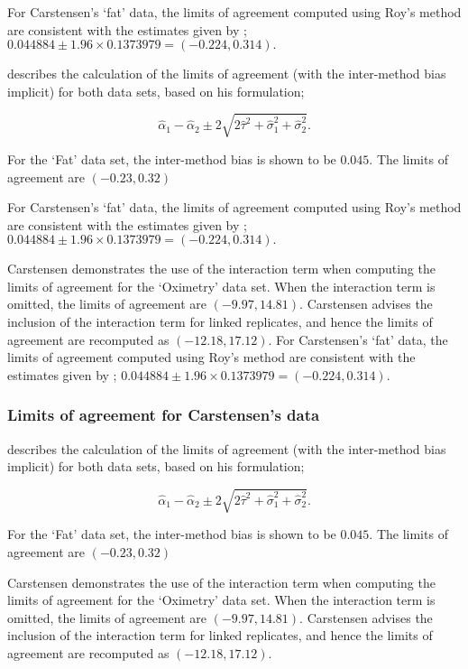 \documentclass[12pt, a4paper]{report}
\theoremstyle{plain}
\theoremstyle{definition}
\theoremstyle{remark}
\begin{document}
	For Carstensen's `fat' data, the limits of agreement computed using Roy's
	method are consistent with the estimates given by \citet{BXC2008}; $0.044884  \pm 1.96 \times  0.1373979 = (-0.224,  0.314).$	
	
	
	\citet{bxc2008} describes the calculation of the limits of agreement (with the inter-method bias implicit) for both data sets, based on his formulation;
	
	\[\hat{\alpha}_1 - \hat{\alpha}_2 \pm 2\sqrt{2\hat{\tau}^2 +\hat{\sigma}_1^2 +\hat{\sigma}_2^2 }.\]
	
	For the `Fat' data set, the inter-method bias is shown to be $0.045$. The limits of agreement are $(-0.23 , 0.32)$
	
	
	
	For Carstensen's `fat' data, the limits of agreement computed using Roy's
	method are consistent with the estimates given by \citet{BXC2008}; $0.044884  \pm 1.96 \times  0.1373979 = (-0.224,  0.314).$
	
	
	Carstensen demonstrates the use of the interaction term when computing the limits of agreement for the `Oximetry' data set. When the interaction term is omitted, the limits of agreement are $(-9.97, 14.81)$. Carstensen advises the inclusion of the interaction term for linked replicates, and hence the limits of agreement are recomputed as $(-12.18,17.12)$.
	\newpage
	For Carstensen's `fat' data, the limits of agreement computed using Roy's
	method are consistent with the estimates given by \citet{BXC2008}; $0.044884  \pm 1.96 \times  0.1373979 = (-0.224,  0.314).$
	
	\subsubsection{Limits of agreement for Carstensen's data}
	
	
	\citet{bxc2008} describes the calculation of the limits of agreement (with the inter-method bias implicit) for both data sets, based on his formulation;
	
	\[\hat{\alpha}_1 - \hat{\alpha}_2 \pm 2\sqrt{2\hat{\tau}^2 +\hat{\sigma}_1^2 +\hat{\sigma}_2^2 }.\]
	
	For the `Fat' data set, the inter-method bias is shown to be $0.045$. The limits of agreement are $(-0.23 , 0.32)$
	
	Carstensen demonstrates the use of the interaction term when computing the limits of agreement for the `Oximetry' data set. When the interaction term is omitted, the limits of agreement are $(-9.97, 14.81)$. Carstensen advises the inclusion of the interaction term for linked replicates, and hence the limits of agreement are recomputed as $(-12.18,17.12)$.
	
\end{document}
